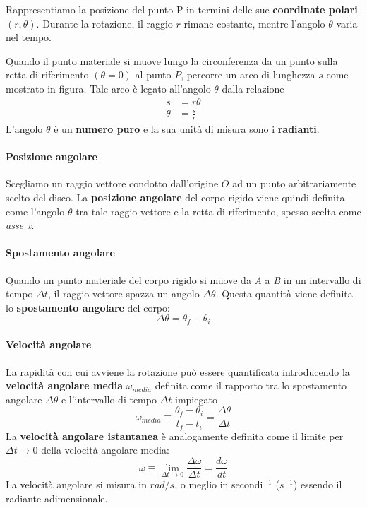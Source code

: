 \documentclass[a4paper,11pt,oneside]{book}
\begin{document}
Rappresentiamo la posizione del punto P in termini delle sue \textbf{coordinate polari} $(r, \theta)$. Durante la rotazione, il raggio $r$ rimane costante, mentre
l'angolo $\theta$ varia nel tempo.

Quando il punto materiale si muove lungo la circonferenza da un punto sulla retta di riferimento $(\theta = 0)$ al punto $P$, percorre un arco di lunghezza $s$ come mostrato in figura.
Tale arco è legato all'angolo $\theta$ dalla relazione
\begin{align*}
    s &= r \theta \\
    \theta &= \frac{s}{r}
\end{align*}
L'angolo $\theta$ è un \textbf{numero puro} e la sua unità di misura sono i \textbf{radianti}.

\paragraph{Posizione angolare}
Scegliamo un raggio vettore condotto dall’origine $O$ ad un punto arbitrariamente scelto del disco.
La \textbf{posizione angolare} del corpo rigido viene quindi definita come l’angolo $\theta$ tra tale raggio vettore e la retta di riferimento, spesso scelta come \emph{asse x}.

\paragraph{Spostamento angolare}
Quando un punto materiale del corpo rigido si muove da \emph{A} a \emph{B} in un intervallo di tempo $\Delta t$, il raggio vettore spazza un angolo $\Delta \theta$.
Questa quantità viene definita lo \textbf{spostamento angolare} del corpo:
\begin{equation*}
    \Delta \theta = \theta_f - \theta_i
\end{equation*}

\paragraph{Velocità angolare}
La rapidità con cui avviene la rotazione può essere quantificata introducendo la \textbf{velocità angolare media} $\omega_{media}$ definita come il rapporto tra 
lo spostamento angolare $\Delta \theta$ e l'intervallo di tempo $\Delta t$ impiegato
\begin{equation*}
    \omega_{media} \equiv \frac{\theta_f - \theta_i}{t_f - t_i} = \frac{\Delta \theta}{\Delta t}
\end{equation*}
La \textbf{velocità angolare istantanea} è analogamente definita come il limite per $\Delta t \to 0$ della velocità angolare media:
\begin{equation*}
    \omega \equiv \lim_{\Delta t \to 0} \frac{\Delta \omega}{\Delta t} = \frac{d\omega}{dt}
\end{equation*}
La velocità angolare si misura in $rad/s$, o meglio in secondi$^{-1}$ ($s^{-1}$) essendo il radiante adimensionale.
\end{document}
